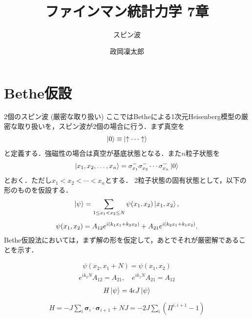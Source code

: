 \documentclass[dvipdfmx,9pt]{beamer}
\numberwithin{equation}{section}
\begin{document}
\title{ファインマン統計力学 7章}
\subtitle{スピン波}
\author{政岡凜太郎}
\frame{\titlepage}

\section{Bethe仮設}
\begin{frame}{2個のスピン波 (厳密な取り扱い)}
    ここではBetheによる1次元Heisenberg模型の厳密な取り扱いを，スピン波が2個の場合に行う．まず真空を
    \begin{align}
        \ket{0} \equiv \ket{\uparrow \cdots \uparrow}
    \end{align}
    と定義する．強磁性の場合は真空が基底状態となる．また$n$粒子状態を
    \begin{align}
        \ket{x_1, x_2, \ldots, x_n} = \sigma_{x_1}^- \sigma_{x_2}^- \cdots \sigma_{x_n}^-\ket{0}
    \end{align}
    とおく．ただし$x_1 < x_2 < \cdots < x_n$とする．
    2粒子状態の固有状態として，以下の形のものを仮設する．
    \begin{gather}
        \ket{\psi} = \sum_{1 \le x_1 < x_2 \le N} \psi(x_1, x_2)\ket{x_1, x_2},
        \\[5pt]
        \psi(x_1, x_2) = A_{12}e^{i(k_1 x_1 + k_2 x_2)} + A_{21}e^{i(k_2 x_1 + k_1 x_2)}.
        \label{2 spin waves: Bethe ansatz wave function}
    \end{gather}
    Bethe仮設法においては，まず解の形を仮定して，あとでそれが厳密解であることを示す．
\end{frame}

\begin{frame}{}
    \begin{align}
        \psi(x_2, x_1+N) = \psi(x_1, x_2)
    \end{align}
    \begin{align}
        e^{ik_2N}A_{12} = A_{21},
        \quad
        e^{ik_1N}A_{21} = A_{12}
    \end{align}
    \begin{align}
        H \ket{\psi} = 4\epsilon J\ket{\psi}
    \end{align}
    \begin{align}
        H = -J\sum_i \bm{\sigma}_i \cdot \bm{\sigma}_{i+1} + NJ = -2J\sum_i (\Pi^{i,i+1}-1)
        \label{2 spin waves: Sch-eq}
    \end{align}
\end{frame}
\end{document}
